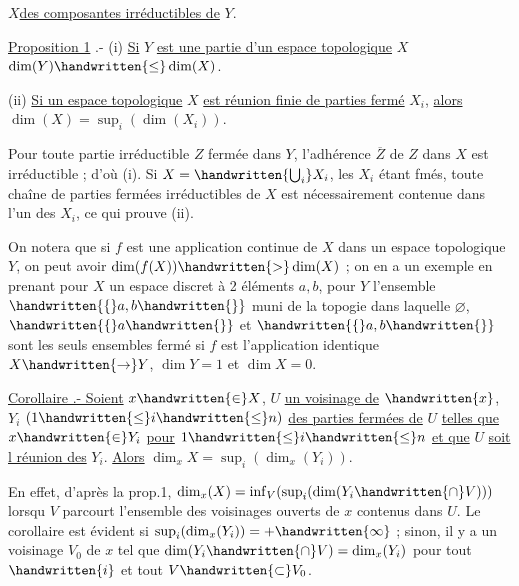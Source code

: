 $X$\handwritten{\,}\uline{des composantes irréductibles de} $Y$.

\uline{Proposition 1} .- (i) \uline{Si} $Y$ \uline{est une partie d'un espace topologique} $X$ $\dim(Y)\handwritten{\leq}\dim(X)$.

(ii) \uline{Si un espace topologique} $X$ \uline{est réunion finie de parties fermé} $X_i$, \uline{alors} $\dim(X)=\sup_i(\dim(X_i))$.


Pour toute partie irréductible $Z$ fermée dans $Y$, l'adhérence $\overline Z$ de $Z$ dans $X$ est irréductible ; d'où (i). Si $X=\handwritten{\bigcup_i}X_i$, les $X_i$ étant fmés, toute chaîne de parties fermées irréductibles de $X$ est nécessairement contenue dans l'un des $X_i$, ce qui prouve (ii).


On notera que si $f$ est une application continue de $X$ dans un espace topologique $Y$, on peut avoir $\dim(f(X))\handwritten{>}\dim(X)$ ; on en a un exemple en prenant pour $X$ un espace discret à 2 éléments $a,b$, pour $Y$ l'ensemble $\handwritten{\{}a,b\handwritten{\}}$ muni de la topogie dans laquelle $\varnothing$, $\handwritten{\{}a\handwritten{\}}$ et $\handwritten{\{}a,b\handwritten{\}}$ sont les seuls ensembles fermé si $f$ est l'application identique $X\handwritten{\to}Y$, $\dim Y=1$ et $\dim X=0$.

\uline{Corollaire .- Soient} $x\handwritten{\in}X$, $U$ \uline{un voisinage de} $\handwritten{x}$, $Y_i$ $(1\handwritten{\leq}i\handwritten{\leq}n)$ \uline{des parties fermées de} $U$ \uline{telles que} $x\handwritten{\in}Y_i$ \uline{pour} $1\handwritten{\leq}i\handwritten{\leq}n$ \uline{et que} $U$ \uline{soit l réunion des} $Y_i$. \uline{Alors} $\dim_x X=\sup_i(\dim_x(Y_i))$.

En effet, d'après la prop.1, $\dim_x(X)=\inf_V(\sup_i(\dim(Y_i\handwritten{\cap}V)))$ lorsqu $V$ parcourt l'ensemble des voisinages ouverts de $x$ contenus dans $U$. Le corollaire est évident si $\sup_i(\dim_x(Y_i))=+\handwritten{\infty}$ ; sinon, il y a un voisinage $V_0$ de $x$ tel que  $\dim(Y_i\handwritten{\cap}V)=\dim_x(Y_i)$ pour tout $\handwritten{i}$ et tout $V\handwritten{\subset}V_0$.

